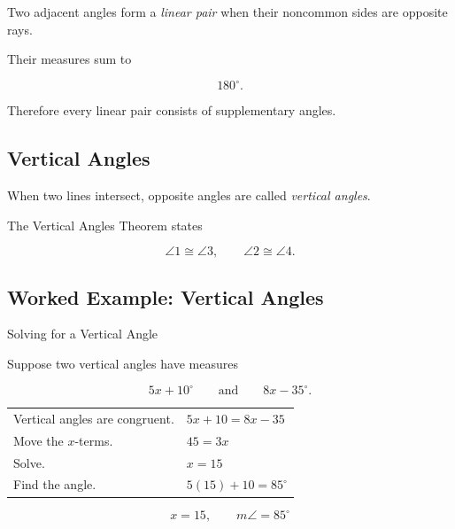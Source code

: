 Two adjacent angles form a \emph{linear pair} when their noncommon sides are
opposite rays.

Their measures sum to

\[ \boxed{180^\circ.} \]

Therefore every linear pair consists of supplementary angles.

\subsection{Vertical Angles}
\label{subsec:vertical-angles}

When two lines intersect, opposite angles are called \emph{vertical angles}.

\begin{centereddiagram}
\end{centereddiagram}

The Vertical Angles Theorem states

\[ \boxed{\angle1\cong\angle3,\qquad\angle2\cong\angle4.} \]

\subsection{Worked Example: Vertical Angles}
\label{subsec:worked-vertical-angles}

\begin{workedexamplebox}{Solving for a Vertical Angle}

Suppose two vertical angles have measures

\[ 5x+10^\circ\qquad\text{and}\qquad8x-35^\circ. \]

\begin{tabularx}{\textwidth}{@{}>{\raggedright\arraybackslash}p{}X@{}}
Vertical angles are congruent. & \(5x+10=8x-35\)\\
Move the \(x\)-terms. & \(45=3x\)\\
Solve. & \(x=15\)\\
Find the angle. & \(5(15)+10=85^\circ\)
\end{tabularx}

\begin{answerbox}
\[ \boxed{x=15,\qquad m\angle=85^\circ} \]
\end{answerbox}
\end{workedexamplebox}

